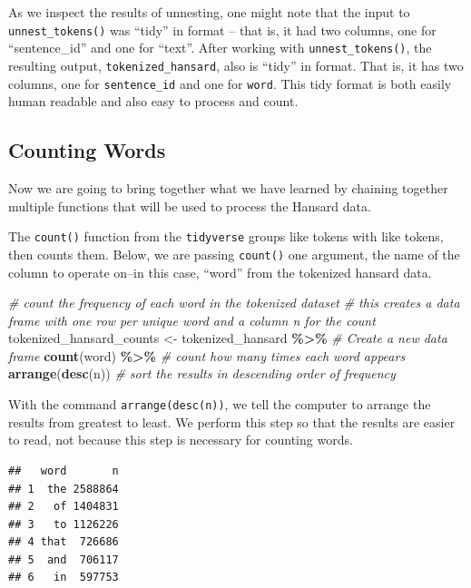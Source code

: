 \documentclass[
]{article}
\newenvironment{Shaded}{\begin{snugshade}}{\end{snugshade}}
\newcommand{\CommentTok}[1]{\textcolor[rgb]{0.56,0.35,0.01}{\textit{#1}}}
\newcommand{\FunctionTok}[1]{\textcolor[rgb]{0.13,0.29,0.53}{\textbf{#1}}}
\newcommand{\NormalTok}[1]{#1}
\newcommand{\OtherTok}[1]{\textcolor[rgb]{0.56,0.35,0.01}{#1}}
\newcommand{\SpecialCharTok}[1]{\textcolor[rgb]{0.81,0.36,0.00}{\textbf{#1}}}
\begin{document}
As we inspect the results of unnesting, one might note that the input to
\texttt{unnest\_tokens()} was ``tidy'' in format -- that is, it had two
columns, one for ``sentence\_id'' and one for ``text''. After working
with \texttt{unnest\_tokens()}, the resulting output,
\texttt{tokenized\_hansard}, also is ``tidy'' in format. That is, it has
two columns, one for \texttt{sentence\_id} and one for \texttt{word}.
This tidy format is both easily human readable and also easy to process
and count.

\subsection{Counting Words}\label{counting-words}

Now we are going to bring together what we have learned by chaining
together multiple functions that will be used to process the Hansard
data.

The \texttt{count()} function from the \texttt{tidyverse} groups like
tokens with like tokens, then counts them. Below, we are passing
\texttt{count()} one argument, the name of the column to operate on--in
this case, ``word'' from the tokenized hansard data.

\begin{Shaded}
\begin{Highlighting}[]
\CommentTok{\# count the frequency of each word in the tokenized dataset}
\CommentTok{\# this creates a data frame with one row per unique word and a column \textquotesingle{}n\textquotesingle{} for the count}
\NormalTok{tokenized\_hansard\_counts }\OtherTok{\textless{}{-}}\NormalTok{ tokenized\_hansard }\SpecialCharTok{\%\textgreater{}\%} \CommentTok{\# Create a new data frame }
  \FunctionTok{count}\NormalTok{(word) }\SpecialCharTok{\%\textgreater{}\%} \CommentTok{\# count how many times each word appears}
  \FunctionTok{arrange}\NormalTok{(}\FunctionTok{desc}\NormalTok{(n)) }\CommentTok{\# sort the results in descending order of frequency}
\end{Highlighting}
\end{Shaded}

With the command \texttt{arrange(desc(n))}, we tell the computer to
arrange the results from greatest to least. We perform this step so that
the results are easier to read, not because this step is necessary for
counting words.

\begin{verbatim}
##   word       n
## 1  the 2588864
## 2   of 1404831
## 3   to 1126226
## 4 that  726686
## 5  and  706117
## 6   in  597753
\end{verbatim}
\end{document}
